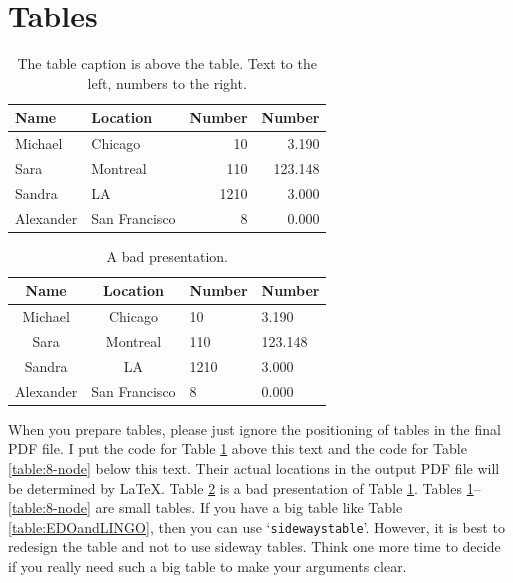 \documentclass[letterpaper, 11pt]{article}
\begin{document}
\section{Tables}


\begin{table} \centering
\caption{The table caption is above the table. Text to the left, numbers to the right. }
\label{tbl:example}
\begin{tabular}{l l r r}
\toprule
Name		& Location		&  Number	& Number \\
\midrule
Michael		& Chicago			&      10   &   3.190  \\
Sara		& Montreal			&     110   & 123.148  \\
Sandra		& LA				&    1210   &   3.000  \\
Alexander	& San Francisco		&       8   &   0.000  \\
\bottomrule
\end{tabular}
\end{table}

\begin{table} \centering
\caption{A bad presentation.}
\label{tbl:bad_example}
\begin{tabular}{c c l l}
\toprule
Name		& Location		&  Number	& Number \\
\midrule
Michael		& Chicago			&      10   &   3.190  \\
Sara		& Montreal			&     110   & 123.148  \\
Sandra		& LA				&    1210   &   3.000  \\
Alexander	& San Francisco		&       8   &   0.000  \\
\bottomrule
\end{tabular}
\end{table}

When you prepare tables, please just ignore the positioning of tables in the final PDF file. I put the code for Table \ref{tbl:example} above this text and the code for Table \ref{table:8-node} below this text. Their actual locations in the output PDF file will be determined by LaTeX. Table \ref{tbl:bad_example} is a bad presentation of Table \ref{tbl:example}. Tables \ref{tbl:example}--\ref{table:8-node} are small tables. If you have a big table like Table \ref{table:EDOandLINGO}, then you can use `\texttt{sidewaystable}'. However, it is best to redesign the table and not to use sideway tables. Think one more time to decide if you really need such a big table to make your arguments clear. 
\end{document}
